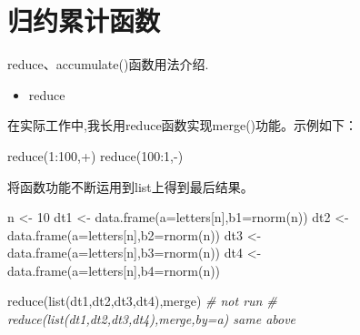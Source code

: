 \documentclass[
]{book}
\newenvironment{Shaded}{\begin{snugshade}}{\end{snugshade}}
\newcommand{\AttributeTok}[1]{\textcolor[rgb]{0.77,0.63,0.00}{#1}}
\newcommand{\CommentTok}[1]{\textcolor[rgb]{0.56,0.35,0.01}{\textit{#1}}}
\newcommand{\DecValTok}[1]{\textcolor[rgb]{0.00,0.00,0.81}{#1}}
\newcommand{\FunctionTok}[1]{\textcolor[rgb]{0.00,0.00,0.00}{#1}}
\newcommand{\NormalTok}[1]{#1}
\newcommand{\OtherTok}[1]{\textcolor[rgb]{0.56,0.35,0.01}{#1}}
\newcommand{\SpecialCharTok}[1]{\textcolor[rgb]{0.00,0.00,0.00}{#1}}
\newcommand{\StringTok}[1]{\textcolor[rgb]{0.31,0.60,0.02}{#1}}
\providecommand{\tightlist}{%
  \setlength{\itemsep}{0pt}\setlength{\parskip}{0pt}}
\begin{document}
\hypertarget{ux5f52ux7ea6ux7d2fux8ba1ux51fdux6570}{%
\section{归约累计函数}\label{ux5f52ux7ea6ux7d2fux8ba1ux51fdux6570}}

reduce、accumulate()函数用法介绍.

\begin{itemize}
\tightlist
\item
  reduce
\end{itemize}

在实际工作中,我长用reduce函数实现merge()功能。示例如下：

\begin{Shaded}
\begin{Highlighting}[]
\FunctionTok{reduce}\NormalTok{(}\DecValTok{1}\SpecialCharTok{:}\DecValTok{100}\NormalTok{,}\StringTok{\textasciigrave{}}\AttributeTok{+}\StringTok{\textasciigrave{}}\NormalTok{)}
\FunctionTok{reduce}\NormalTok{(}\DecValTok{100}\SpecialCharTok{:}\DecValTok{1}\NormalTok{,}\StringTok{\textasciigrave{}}\AttributeTok{{-}}\StringTok{\textasciigrave{}}\NormalTok{)}
\end{Highlighting}
\end{Shaded}

将函数功能不断运用到list上得到最后结果。

\begin{Shaded}
\begin{Highlighting}[]
\NormalTok{n }\OtherTok{\textless{}{-}} \DecValTok{10}
\NormalTok{dt1 }\OtherTok{\textless{}{-}} \FunctionTok{data.frame}\NormalTok{(}\AttributeTok{a=}\NormalTok{letters[n],}\AttributeTok{b1=}\FunctionTok{rnorm}\NormalTok{(n))}
\NormalTok{dt2 }\OtherTok{\textless{}{-}} \FunctionTok{data.frame}\NormalTok{(}\AttributeTok{a=}\NormalTok{letters[n],}\AttributeTok{b2=}\FunctionTok{rnorm}\NormalTok{(n))}
\NormalTok{dt3 }\OtherTok{\textless{}{-}} \FunctionTok{data.frame}\NormalTok{(}\AttributeTok{a=}\NormalTok{letters[n],}\AttributeTok{b3=}\FunctionTok{rnorm}\NormalTok{(n))}
\NormalTok{dt4 }\OtherTok{\textless{}{-}} \FunctionTok{data.frame}\NormalTok{(}\AttributeTok{a=}\NormalTok{letters[n],}\AttributeTok{b4=}\FunctionTok{rnorm}\NormalTok{(n))}

\FunctionTok{reduce}\NormalTok{(}\FunctionTok{list}\NormalTok{(dt1,dt2,dt3,dt4),merge)}
\CommentTok{\# not run}
\CommentTok{\# reduce(list(dt1,dt2,dt3,dt4),merge,by=\textquotesingle{}a\textquotesingle{}) same above}
\end{Highlighting}
\end{Shaded}
\end{document}
